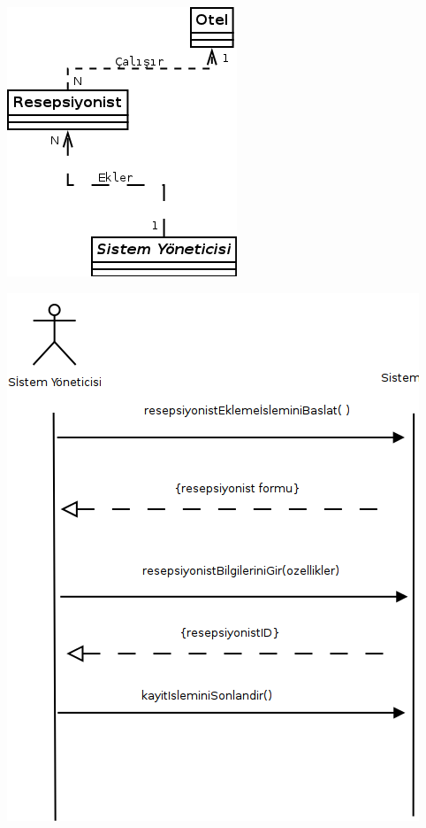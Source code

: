 \documentclass[12pt,a4paper]{report}
\begin{document}
\begin{center}
\includegraphics{dia/usecase5.png}
\end{center}

\newpage

\begin{center}
\includegraphics{dia/ssd-usecase5.png}
\end{center}
\end{document}
